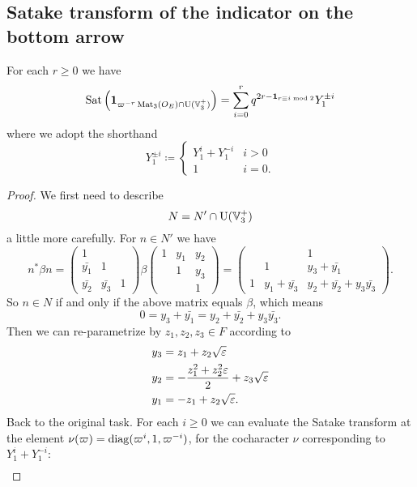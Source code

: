 \subsection{Satake transform of the indicator on the bottom arrow}
\begin{proposition}
  For each $r \ge 0$ we have
  \[ \operatorname{Sat}\left(\mathbf{1}_{\varpi^{-r} \operatorname{Mat}_3(O_E) \cap \operatorname{U}(\mathbb V_3^+)}\right)
    = \sum_{i=0}^r q^{2r - \mathbf{1}_{r \equiv i \bmod 2}} Y_1^{\pm i} \]
  where we adopt the shorthand
  \[
    Y_1^{\pm i} \coloneqq
    \begin{cases}
      Y_1^i + Y_1^{-i} & i > 0 \\
      1 & i = 0 .
    \end{cases}
  \]
\end{proposition}
\begin{proof}
  We first need to describe \[ N = N' \cap \operatorname{U}(\mathbb V_3^+) \] a little more carefully.
  For $n \in N'$ we have
  \[
    n^\ast \beta n
    =
    \begin{pmatrix} 1 \\ \bar{y_1} & 1 \\ \bar{y_2} & \bar{y_3} & 1 \end{pmatrix}
    \beta
    \begin{pmatrix}
      1 & y_1 & y_2 \\
        & 1 & y_3 \\
        & & 1
    \end{pmatrix}
    = \begin{pmatrix}
      & & 1 \\
      & 1 & y_3 + \bar{y_1} \\
      1 & y_1 + \bar{y_3} & y_2 + \bar{y_2} + y_3 \bar{y_3}
    \end{pmatrix}.
  \]
  So $n \in N$ if and only if the above matrix equals $\beta$, which means
  \[ 0 = y_3 + \bar{y_1} = y_2 + \bar{y_2} + y_3 \bar{y_3}. \]
  Then we can re-parametrize by $z_1, z_2, z_3 \in F$ according to
  \begin{align*}
    y_3 &= z_1 + z_2 \sqrt{\varepsilon} \\
    y_2 &= -\frac{z_1^2 + z_2^2 \varepsilon}{2} + z_3\sqrt{\varepsilon} \\
    y_1 &= -z_1 + z_2\sqrt{\varepsilon}.
  \end{align*}
  Back to the original task.
  For each $i \ge 0$ we can evaluate the Satake transform at the element
  $\nu(\varpi) = \operatorname{diag}(\varpi^i, 1, \varpi^{-i})$, for the cocharacter $\nu$
  corresponding to $Y_1^i + Y_1^{-i}$:
  \begin{align*}

\end{align*}
\end{proof}
